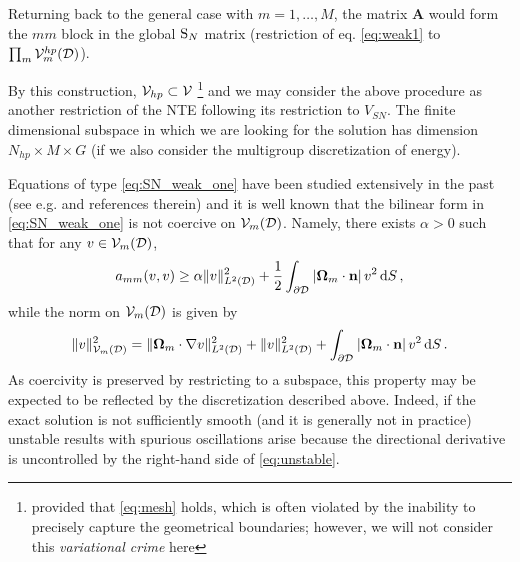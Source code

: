 \noindent Returning back to the general case with $m = 1,\ldots,M$, the matrix $\mathbf{A}$
would form the $mm$ block in the global $\SN$ matrix (restriction of eq. \eqref{eq:weak1} to $\prod_{m}
\Space_{m}^{hp}(\VV)$).

By this construction, $\Space_{hp} \subset \Space$ \footnote{provided that \eqref{eq:mesh} holds, which is often
violated by the inability to precisely capture the geometrical boundaries; however, we will not consider this
\textit{variational crime} here} and we may consider the above procedure as another restriction of the NTE following its restriction to $V_{SN}$.
The finite dimensional subspace in which we are looking for the solution has dimension $N_{hp} \times M \times G$ (if we also consider the multigroup discretization of energy).

Equations of type \eqref{eq:SN_weak_one} have been studied extensively in the past (see e.g. \cite{hartmann} and
references therein) and it is well known that the bilinear form in \eqref{eq:SN_weak_one} is not coercive on
$\Space_m(\VV)$. Namely, there exists $\alpha > 0$ such that for any $v \in \Space_m(\VV)$,
\begin{equation}\label{eq:unstable}
	a_{mm}(v,v) \geq \alpha \norm[{\Lp[2](\VV)}]{v}^2 + \frac{1}{2}\int_{\pV} \abs{\bomega_m\cdot\bn} v^2 \,\d{S},
\end{equation}
while the norm on $\Space_m(\VV)$ is given by
$$
	\norm[{\Space_m(\VV)}]{v}^2 = \norm[{\Lp[2](\VV)}]{\bomega_m\cdot\nabla v}^2 + \norm[{\Lp[2](\VV)}]{v}^2 +
	\int_{\pV} \abs{\bomega_m\cdot\bn} v^2 \,\d{S}. 
$$
As coercivity is preserved by restricting to a subspace, this property may be expected to be reflected by the
discretization described above. Indeed, if the exact solution is not sufficiently smooth (and it is generally not in
practice) unstable results with spurious oscillations arise because the directional derivative is uncontrolled by the
right-hand side of \eqref{eq:unstable}.

